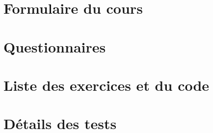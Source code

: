 
\chapter{Formulaire du cours}\label{ann:formulaire}

\chapter{Questionnaires}\label{ann:questionnaires}

\chapter{Liste des exercices et du code}\label{ann:code}

\chapter{Détails des tests}\label{ann:tests}
